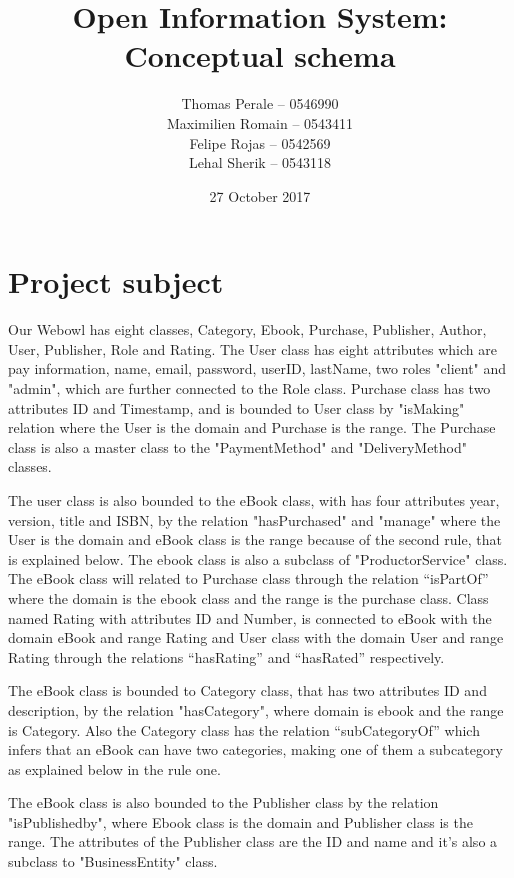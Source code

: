 ﻿\documentclass[a4paper,11pt]{article}
\begin{document}
\title{Open Information System: Conceptual schema}
\author{Thomas Perale -- 0546990\\Maximilien Romain -- 0543411\\Felipe Rojas -- 0542569\\Lehal Sherik -- 0543118}
\date{27 October 2017}

\maketitle

\section{Project subject}

Our Webowl has eight classes, Category, Ebook, Purchase, Publisher, Author, User, Publisher, Role and Rating.
The User class has eight attributes which are pay information, name, email, password, userID, lastName, two roles "client" and "admin", which are further connected to the Role class.
Purchase class has two attributes ID and Timestamp, and is bounded to User class by "isMaking" relation where the User is the domain and Purchase is the range. The Purchase class is also a master class to the "PaymentMethod" and "DeliveryMethod" classes.


The user class is also bounded to the eBook class, with has four attributes year, version, title and ISBN, by the relation "hasPurchased" and "manage" where the User is the domain and eBook class is the range because of the second rule, that is explained below. The ebook class is also a subclass of "ProductorService" class. The eBook class will related to Purchase class through the relation “isPartOf” where the domain is the ebook class and the range is the purchase class. 
Class named Rating with attributes ID and Number, is connected to eBook with the domain eBook and range Rating and User class with the domain User and range Rating through the relations “hasRating” and “hasRated” respectively.

The eBook class is bounded to Category class, that has two attributes ID and description, by the relation "hasCategory", where domain is ebook and the range is Category. Also the Category class has the relation “subCategoryOf” which infers that an eBook can have two categories, making one of them a subcategory as explained below in the rule one.

The eBook class is also bounded to the Publisher class by the relation "isPublishedby", where Ebook class is the domain and Publisher class is the range. The attributes of the Publisher class are the ID and name and it's also a subclass to "BusinessEntity" class.
\end{document}
